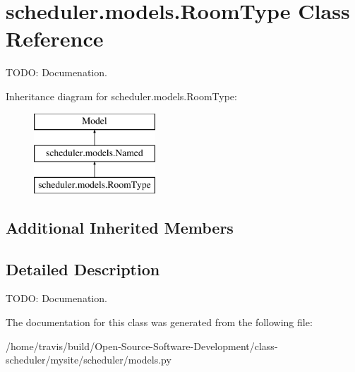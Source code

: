 \hypertarget{classscheduler_1_1models_1_1_room_type}{\section{scheduler.\-models.\-Room\-Type Class Reference}
\label{classscheduler_1_1models_1_1_room_type}
}


T\-O\-D\-O\-: Documenation.  


Inheritance diagram for scheduler.\-models.\-Room\-Type\-:\begin{figure}[H]
\begin{center}
\leavevmode
\includegraphics[height=3.000000cm]{classscheduler_1_1models_1_1_room_type}
\end{center}
\end{figure}
\subsection*{Additional Inherited Members}


\subsection{Detailed Description}
T\-O\-D\-O\-: Documenation. 

The documentation for this class was generated from the following file\-:\begin{DoxyCompactItemize}
\item 
/home/travis/build/\-Open-\/\-Source-\/\-Software-\/\-Development/class-\/scheduler/mysite/scheduler/models.\-py\end{DoxyCompactItemize}

